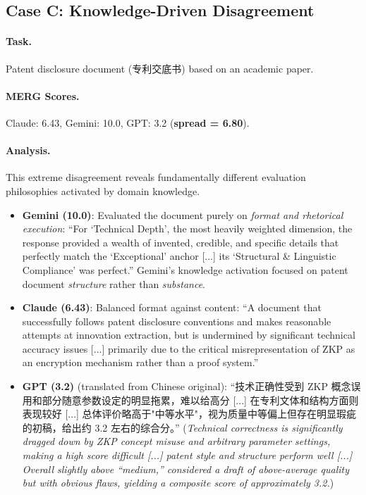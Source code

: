 \documentclass{article}
\newcommand{\zh}[1]{#1}
\newcommand{\zh}[1]{\begin{CJK}{UTF8}{gbsn}#1\end{CJK}}
\begin{document}
\subsection{Case C: Knowledge-Driven Disagreement}
\label{case:disagreement_knowledge}

\paragraph{Task.} Patent disclosure document (\zh{专利交底书}) based on an academic paper.

\paragraph{MERG Scores.} Claude: 6.43, Gemini: 10.0, GPT: 3.2 (\textbf{spread = 6.80}).

\paragraph{Analysis.} This extreme disagreement reveals fundamentally different evaluation philosophies activated by domain knowledge.
\begin{itemize}
    \item \textbf{Gemini (10.0)}: Evaluated the document purely on \textit{format and rhetorical execution}: ``For `Technical Depth', the most heavily weighted dimension, the response provided a wealth of invented, credible, and specific details that perfectly match the `Exceptional' anchor [...] its `Structural \& Linguistic Compliance' was perfect.'' Gemini's knowledge activation focused on patent document \textit{structure} rather than \textit{substance}.
    \item \textbf{Claude (6.43)}: Balanced format against content: ``A document that successfully follows patent disclosure conventions and makes reasonable attempts at innovation extraction, but is undermined by significant technical accuracy issues [...] primarily due to the critical misrepresentation of ZKP as an encryption mechanism rather than a proof system.''
    \item \textbf{GPT (3.2)} (translated from Chinese original): ``\zh{技术正确性受到 ZKP 概念误用和部分随意参数设定的明显拖累，难以给高分} [...] \zh{在专利文体和结构方面则表现较好} [...] \zh{总体评价略高于"中等水平"，视为质量中等偏上但存在明显瑕疵的初稿，给出约 3.2 左右的综合分。}'' (\textit{Technical correctness is significantly dragged down by ZKP concept misuse and arbitrary parameter settings, making a high score difficult [...] patent style and structure perform well [...] Overall slightly above ``medium,'' considered a draft of above-average quality but with obvious flaws, yielding a composite score of approximately 3.2.})
\end{itemize}
\end{document}
